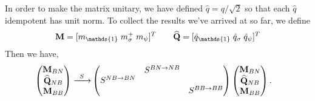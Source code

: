 \documentclass[12pt,a4paper]{article}
\newcounter{arrow}
\newcommand{\unit}{\mathds{1}}
\begin{document}
In order to make the matrix unitary, we have defined $\hat{q} = q/\sqrt{2}$ so that each $\hat{q}$ idempotent has unit norm.
To collect the results we've arrived at so far, we define
\begin{align}
{\bf M} = [ m_\unit \;  m_\sigma^+\;  m_\psi]^T \qquad \widehat{{\bf Q} }= [\hat{q}_\unit \; \hat{q}_\sigma \; \hat{q}_\psi ]^T
\end{align}
Then we have,
\begin{align}
\left( \begin{matrix}
{\bf M}_{BN}\\
\widehat{{\bf Q} }_{NB}\\
{\bf M}_{BB}\\
\end{matrix} \right)
\xrightarrow{\;\; S \; \; } & \left( \begin{matrix}
&S^{BN \rightarrow NB}&\\
S^{NB \rightarrow BN}&&\\
&&S^{BB \rightarrow BB}\\
\end{matrix} \right)
\left( \begin{matrix}
{\bf M}_{BN}\\
\widehat{{\bf Q} }_{NB}\\
{\bf M}_{BB}\\
\end{matrix} \right).
\end{align}
\end{document}
